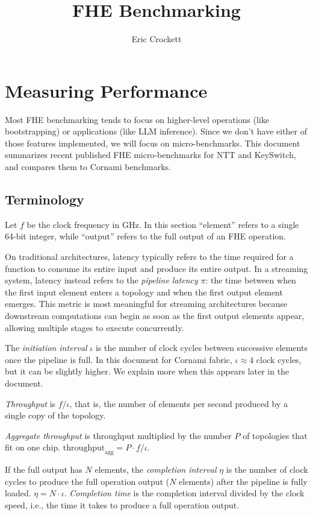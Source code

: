 \documentclass{article}
\begin{document}
	\title{FHE Benchmarking}
	\author{Eric Crockett}
	\maketitle
	
	\section{Measuring Performance}
	\label{sec:measurement}
	Most FHE benchmarking tends to focus on higher-level operations (like bootstrapping) or applications (like LLM inference). Since we don't have either of those features implemented, we will focus on micro-benchmarks. This document summarizes recent published FHE micro-benchmarks for NTT and KeySwitch,  and compares them to Cornami benchmarks.
	
	\subsection{Terminology}
	Let $f$ be the clock frequency in GHz. In this section ``element'' refers to a single 64-bit integer, while ``output'' refers to the full output of an FHE operation.
	
	On traditional architectures, latency typically refers to the time required for a function to consume its entire input and produce its entire output. In a streaming system, latency instead refers to the \emph{pipeline latency} $\pi$: the time between when the first input element enters a topology and when the first output element emerges. This metric is most meaningful for streaming architectures because downstream computations can begin as soon as the first output elements appear, allowing multiple stages to execute concurrently.
	
	The \emph{initiation interval} $\iota$ is the number of clock cycles between successive elements once the pipeline is full. In this document for Cornami fabric, $\iota\approx4$ clock cycles, but it can be slightly higher. We explain more when this appears later in the document.
	
	\emph{Throughput} is $f/\iota$, that is, the number of elements per second produced by a single copy of the topology.
	
	\emph{Aggregate throughput} is throughput multiplied by the number $P$ of topologies that fit on one chip. $\mathrm{throughput}_\mathrm{agg} = P\cdot f/\iota$.
	
	If the full output has $N$ elements, the \emph{completion interval} $\eta$ is the number of clock cycles to produce the full operation output ($N$ elements) after the pipeline is fully loaded. $\eta = N\cdot \iota$. \emph{Completion time} is the completion interval divided by the clock speed, i.e., the time it takes to produce a full operation output. 
	
\end{document}

